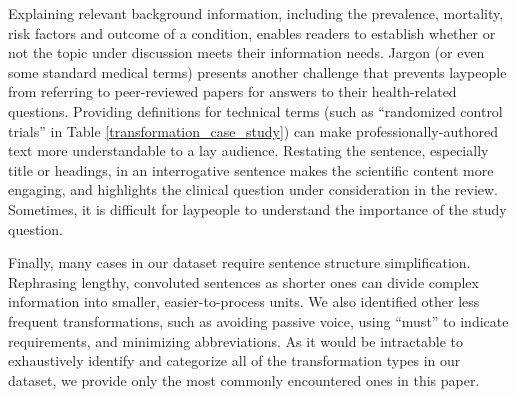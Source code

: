 \documentclass[letterpaper, table]{article} %
\newcommand{\draftonly}[1]{#1}
\newcommand{\draftcomment}[3]{\draftonly{\textcolor{#2}{[#3]{$_{\textsc{\tiny #1}}$}}}}
\newcommand{\yizhong}[1]{\draftcomment{Yizhong}{blue}{#1}}
\begin{document}
Explaining relevant background information, including the prevalence, mortality, risk factors and outcome of a condition, enables readers to establish whether or not the topic under discussion meets their information needs. Jargon (or even some standard medical terms) presents another challenge that prevents laypeople from referring to peer-reviewed papers for answers to their health-related questions. Providing definitions for technical terms (such as ``randomized control trials'' in Table \ref{transformation_case_study}) can make professionally-authored text more understandable to a lay audience. Restating the sentence, especially title or headings, in an interrogative sentence makes the scientific content more engaging, and highlights the clinical question under consideration in the review. Sometimes, it is difficult for laypeople to understand the importance of the study question.

Finally, many cases in our dataset require sentence structure simplification. Rephrasing lengthy, convoluted sentences as shorter ones can divide complex information into smaller, easier-to-process units. We also identified other less frequent transformations, such as avoiding passive voice, using ``must'' to indicate requirements, and minimizing abbreviations. As it would be intractable to exhaustively identify and categorize all of the transformation types in our dataset, we provide only the most commonly encountered ones in this paper.



\end{document}

